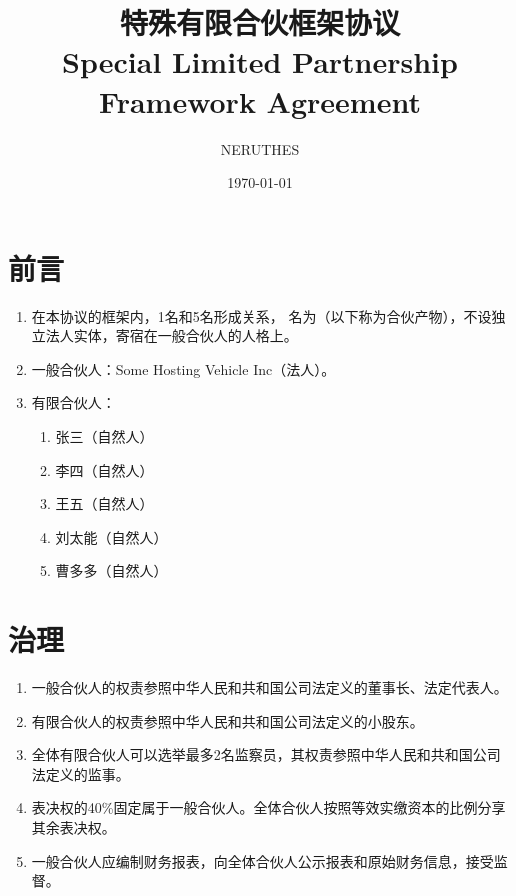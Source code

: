 \documentclass[a4paper,11pt]{article}
\title{特殊有限合伙框架协议\\Special Limited Partnership\\Framework Agreement}
\author{NERUTHES}
\date{\today}
\begin{document}
\maketitle




\section{前言}
\begin{enumerate}
    \item 在本协议的框架内，1名和5名形成关系，
    名为（以下称为合伙产物），不设独立法人实体，寄宿在一般合伙人的人格上。
    \item 一般合伙人：Some Hosting Vehicle Inc（法人）。
    \item 有限合伙人：
    \begin{enumerate}
        \item 张三（自然人）
        \item 李四（自然人）
        \item 王五（自然人）
        \item 刘太能（自然人）
        \item 曹多多（自然人）
    \end{enumerate}
\end{enumerate}



\section{治理}
\begin{enumerate}
    \item 一般合伙人的权责参照中华人民和共和国公司法定义的董事长、法定代表人。
    \item 有限合伙人的权责参照中华人民和共和国公司法定义的小股东。
    \item 全体有限合伙人可以选举最多2名监察员，其权责参照中华人民和共和国公司法定义的监事。
    \item 表决权的40\%固定属于一般合伙人。全体合伙人按照等效实缴资本的比例分享其余表决权。
    \item 一般合伙人应编制财务报表，向全体合伙人公示报表和原始财务信息，接受监督。
\end{enumerate}
\end{document}
